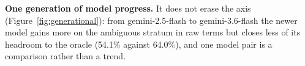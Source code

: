 \textbf{One generation of model progress.} It does not erase the axis (Figure~\ref{fig:generational}): from
gemini-2.5-flash to gemini-3.6-flash the newer model gains more on the ambiguous stratum in raw terms but
closes less of its headroom to the oracle (54.1\% against 64.0\%), and one model pair is a comparison
rather than a trend.
